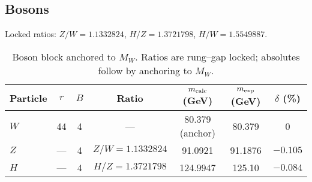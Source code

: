 \documentclass[%
 amsmath,amssymb,
 aps,
prb,
floatfix, showkeys
]{revtex4-2}
\begin{document}
\subsection{Bosons}
Locked ratios: $Z/W=1.1332824$, $H/Z=1.3721798$, $H/W=1.5549887$.
\begin{table}[H]
\caption{Boson block anchored to $M_W$. Ratios are rung--gap locked; absolutes follow by anchoring to $M_W$.}
\label{tab:bosons}
\begin{tabular}{l c c c c c c}
\hline
Particle & $r$ & $B$ & Ratio & $m_{\rm calc}$ (GeV) & $m_{\rm exp}$ (GeV) & $\delta$ (\%) \\
\hline
$W$ & 44  & 4 & ---                 & 80.379 (anchor) & 80.379   & 0 \\
$Z$ & --- & 4 & $Z/W=1.1332824$    & 91.0921         & 91.1876  & $-0.105$ \\
$H$ & --- & 4 & $H/Z=1.3721798$    & 124.9947        & 125.10   & $-0.084$ \\
\hline
\end{tabular}
\end{table}
\end{document}
